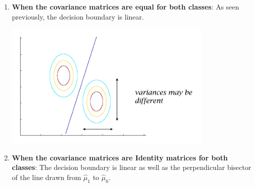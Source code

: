 \documentclass[
]{article}
\providecommand{\tightlist}{%
  \setlength{\itemsep}{0pt}\setlength{\parskip}{0pt}}
\begin{document}
\begin{enumerate}
\def\labelenumi{\arabic{enumi}.}
\tightlist
\item
  \textbf{When the covariance matrices are equal for both classes}: As
  seen previously, the decision boundary is linear.

\includegraphics[width=10cm]{../images/equal_var.png} 

\item 
    \textbf{When the covariance
matrices are Identity matrices for both classes}: The decision boundary
is linear as well as the perpendicular bisector of the line drawn from
\(\hat{\mu}_1\) to \(\hat{\mu}_0\).


\end{enumerate}
\end{document}
